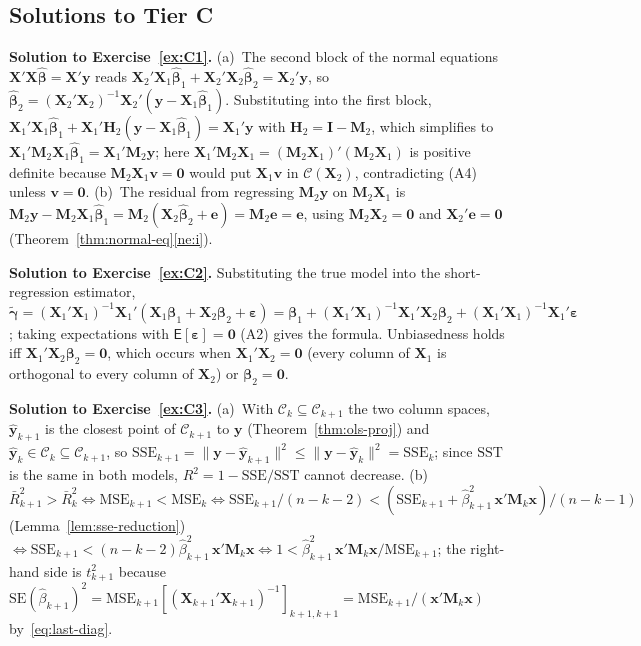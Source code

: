 \documentclass[12pt,a4paper]{article}
\theoremstyle{definition}
\newcommand\expc{\mathsf{E}}
\newcommand{\SST}{\mathrm{SST}}
\newcommand{\SSE}{\mathrm{SSE}}
\newcommand{\MSE}{\mathrm{MSE}}
\newcommand{\SE}{\mathrm{SE}}
\newcommand{\bX}{\mathbf{X}}
\newcommand{\by}{\mathbf{y}}
\newcommand{\bx}{\mathbf{x}}
\def\bb{\boldsymbol{\beta}}
\newcommand{\be}{\boldsymbol{\varepsilon}}
\newcommand{\bI}{\mathbf{I}}
\newcommand{\bH}{\mathbf{H}}
\newcommand{\bM}{\mathbf{M}}
\newcommand{\bzero}{\mathbf{0}}
\newcommand{\bv}{\mathbf{v}}
\newcommand{\calC}{\mathcal{C}}
\begin{document}
\subsection*{Solutions to Tier C}

\textbf{Solution to Exercise~\ref{ex:C1}.} (a)~The second block of the normal equations $\bX'\bX\hat{\bb} = \bX'\by$ reads $\bX_2'\bX_1\hat{\bb}_1 + \bX_2'\bX_2\hat{\bb}_2 = \bX_2'\by$, so $\hat{\bb}_2 = (\bX_2'\bX_2)^{-1}\bX_2'(\by - \bX_1\hat{\bb}_1)$. Substituting into the first block, $\bX_1'\bX_1\hat{\bb}_1 + \bX_1'\bH_2(\by - \bX_1\hat{\bb}_1) = \bX_1'\by$ with $\bH_2 = \bI - \bM_2$, which simplifies to $\bX_1'\bM_2\bX_1\hat{\bb}_1 = \bX_1'\bM_2\by$; here $\bX_1'\bM_2\bX_1 = (\bM_2\bX_1)'(\bM_2\bX_1)$ is positive definite because $\bM_2\bX_1\bv = \bzero$ would put $\bX_1\bv$ in $\calC(\bX_2)$, contradicting (A4) unless $\bv = \bzero$. (b)~The residual from regressing $\bM_2\by$ on $\bM_2\bX_1$ is $\bM_2\by - \bM_2\bX_1\hat{\bb}_1 = \bM_2(\bX_2\hat{\bb}_2 + \mathbf{e}) = \bM_2\mathbf{e} = \mathbf{e}$, using $\bM_2\bX_2 = \bzero$ and $\bX_2'\mathbf{e} = \bzero$ (Theorem~\ref{thm:normal-eq}\ref{ne:i}).

\textbf{Solution to Exercise~\ref{ex:C2}.} Substituting the true model into the short-regression estimator, $\tilde{\boldsymbol\gamma} = (\bX_1'\bX_1)^{-1}\bX_1'(\bX_1\bb_1 + \bX_2\bb_2 + \be) = \bb_1 + (\bX_1'\bX_1)^{-1}\bX_1'\bX_2\bb_2 + (\bX_1'\bX_1)^{-1}\bX_1'\be$; taking expectations with $\expc[\be] = \bzero$ (A2) gives the formula. Unbiasedness holds iff $\bX_1'\bX_2\bb_2 = \bzero$, which occurs when $\bX_1'\bX_2 = \bzero$ (every column of $\bX_1$ is orthogonal to every column of $\bX_2$) or $\bb_2 = \bzero$.

\textbf{Solution to Exercise~\ref{ex:C3}.} (a)~With $\calC_k \subseteq \calC_{k+1}$ the two column spaces, $\hat{\by}_{k+1}$ is the closest point of $\calC_{k+1}$ to $\by$ (Theorem~\ref{thm:ols-proj}) and $\hat{\by}_k \in \calC_k \subseteq \calC_{k+1}$, so $\SSE_{k+1} = \|\by - \hat{\by}_{k+1}\|^2 \leqslant \|\by - \hat{\by}_k\|^2 = \SSE_k$; since $\SST$ is the same in both models, $R^2 = 1 - \SSE/\SST$ cannot decrease. (b)~$\bar{R}^2_{k+1} > \bar{R}^2_k \iff \MSE_{k+1} < \MSE_k \iff \SSE_{k+1}/(n-k-2) < (\SSE_{k+1} + \hat{\beta}_{k+1}^2\,\bx'\bM_k\bx)/(n-k-1)$ (Lemma~\ref{lem:sse-reduction}) $\iff \SSE_{k+1} < (n-k-2)\hat{\beta}_{k+1}^2\,\bx'\bM_k\bx \iff 1 < \hat{\beta}_{k+1}^2\,\bx'\bM_k\bx/\MSE_{k+1}$; the right-hand side is $t_{k+1}^2$ because $\SE(\hat{\beta}_{k+1})^2 = \MSE_{k+1}[(\bX_{k+1}'\bX_{k+1})^{-1}]_{k+1,k+1} = \MSE_{k+1}/(\bx'\bM_k\bx)$ by~\eqref{eq:last-diag}.
\end{document}
